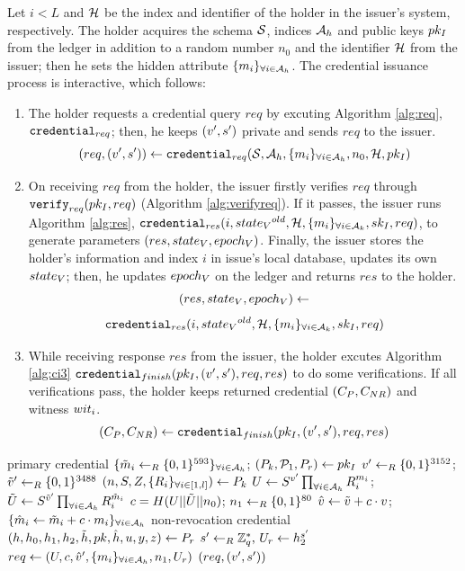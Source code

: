 \documentclass{article}
\begin{document}
Let $i<L$ and $\mch $ be the index and identifier of the holder in the issuer's system, respectively. The holder acquires the schema $\mc{S}$, indices $\ah$ and public keys $\pki$ from the ledger in addition to a random number $n_0$ and the identifier $\mch $ from the issuer; then he sets the hidden attribute $\group{m_i}{i}{\ah}$. The credential issuance process is interactive, which follows: 
\begin{enumerate}
	\item The holder requests a credential query $req$ by excuting Algorithm \ref{alg:req}, $\crreq$; then, he keeps $\vs  $ private and sends $req$ to the issuer.
	\begin{equation}
		(req, \vs) \la \crreqp
	\end{equation}
	\item On receiving $req$ from the holder, the issuer firstly verifies $req$ through $\verifyph $ (Algorithm \ref{alg:verifyreq}). If it passes, the issuer runs Algorithm \ref{alg:res}, $\crresp$, to generate parameters $\crrespp $. Finally, the issuer stores the holder’s information and index $i$ in issue’s local database, updates its own $\stv$; then, he updates $\epv$ on the ledger and returns $res$ to the holder.
	\begin{displaymath}
		\crrespp \la 
	\end{displaymath}
	\begin{equation}
		\crresp
	\end{equation}
	\item While receiving response $res$ from the issuer, the holder excutes Algorithm \ref{alg:ci3} $\crfinishp$ to do some verifications. If all verifications pass, the holder keeps returned credential $(\cpnr )$ and witness $\witi $.
	\begin{equation}
		 (\cpnr )\la \crfinishp
	\end{equation}
\end{enumerate}

\begin{algorithm}
\caption{$\crreqp$}
\label{alg:req}
\begin{algorithmic}
	\State \Comment primary credential
	\State $\group{\td{m}_i\lar \binbits{593}}{i}{\ah}$; $\pkip \la \pki$
	\State $v'\lar \binbits{3152}$; $\td{v}'\lar \binbits{3488}$
	\State $\pkp \la \pk $
	\State $U\la S^{v'}\prodi{i}{\ah}{R_{i}^{m_{i}}}$; $\td{U}\la S^{\td{v}'}\prodi{i}{\ah}{R_{i}^{\td{m}_{i}}}$
	\State $c = H(U||\td{U}||n_{0})$; $n_1\lar \binbits{80}$
	\State $\zkp{v}{}$; $\group{\zkp{m}{i}}{i}{\ah}$
	\State \Comment non-revocation credential
	\State $\prp \la \pr $
	\State $\randexp{s'}{q}{U_{r}}{h_{2}}$
	\State $req \la \reqp  $
	\State \Return $(req, \vs )$
\end{algorithmic}
\end{algorithm}
\end{document}

